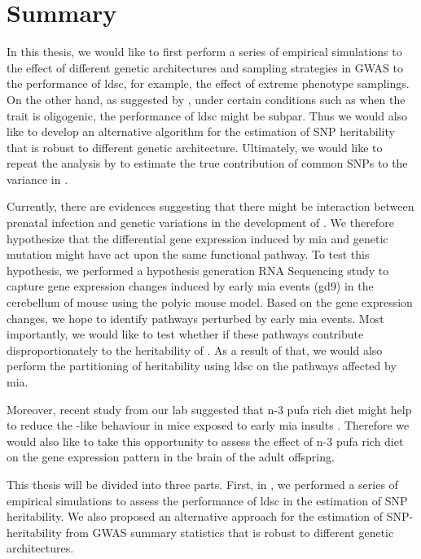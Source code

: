	
	
	\section{Summary}
	In this thesis, we would like to first perform a series of empirical simulations to the effect of different genetic architectures and sampling strategies in \gls{GWAS} to the performance of \gls{ldsc}, for example, the effect of extreme phenotype samplings.
	On the other hand, as suggested by \citet{Bulik-Sullivan2015}, under certain conditions such as when the trait is oligogenic, the performance of \gls{ldsc} might be subpar. 
	Thus we would also like to develop an alternative algorithm for the estimation of \gls{SNP} heritability that is robust to different genetic architecture.
	Ultimately, we would like to repeat the analysis by \citet{Bulik-Sullivan2015} to estimate the true contribution of common \glspl{SNP} to the variance in .

	Currently, there are evidences suggesting that there might be interaction between prenatal infection and genetic variations in the development of  \citep{Tienari2004,Clarke2009}.
	We therefore hypothesize that the differential gene expression induced by \gls{mia} and genetic mutation might have act upon the same functional pathway.
	To test this hypothesis, we performed a hypothesis generation RNA Sequencing study to capture gene expression changes induced by early \gls{mia} events (\gls{gd}9) in the cerebellum of mouse using the \gls{polyic} mouse model.
	Based on the gene expression changes, we hope to identify pathways perturbed by early \gls{mia} events.
	Most importantly, we would like to test whether if these pathways contribute disproportionately to the heritability of .
	As a result of that, we would also perform the partitioning of heritability using \gls{ldsc} on the pathways affected by \gls{mia}.
	
	Moreover, recent study from our lab suggested that n-3 \gls{pufa} rich diet might help to reduce the -like behaviour in mice exposed to early \gls{mia} insults \citep{Li2015}. 
	Therefore we would also like to take this opportunity to assess the effect of n-3 \gls{pufa} rich diet on the gene expression pattern in the brain of the adult offspring.
	
	This thesis will be divided into three parts.
	First, in , we performed a series of empirical simulations to assess the performance of \gls{ldsc} in the estimation of \gls{SNP} heritability. 
	We also proposed an alternative approach for the estimation of \gls{SNP}-heritability from \gls{GWAS} summary statistics that is robust to different genetic architectures.
	

